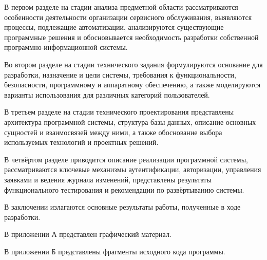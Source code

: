 В первом разделе на стадии анализа предметной области рассматриваются особенности деятельности организации сервисного обслуживания, выявляются процессы, подлежащие автоматизации, анализируются существующие программные решения и обосновывается необходимость разработки собственной программно-информационной системы.

Во втором разделе на стадии технического задания формулируются основание для разработки, назначение и цели системы, требования к функциональности, безопасности, программному и аппаратному обеспечению, а также моделируются варианты использования для различных категорий пользователей.

В третьем разделе на стадии технического проектирования представлены архитектура программной системы, структура базы данных, описание основных сущностей и взаимосвязей между ними, а также обоснование выбора используемых технологий и проектных решений.

В четвёртом разделе приводится описание реализации программной системы, рассматриваются ключевые механизмы аутентификации, авторизации, управления заявками и ведения журнала изменений, представлены результаты функционального тестирования и рекомендации по развёртыванию системы.

В заключении излагаются основные результаты работы, полученные в ходе разработки.

В приложении А представлен графический материал.

В приложении Б представлены фрагменты исходного кода программы.
